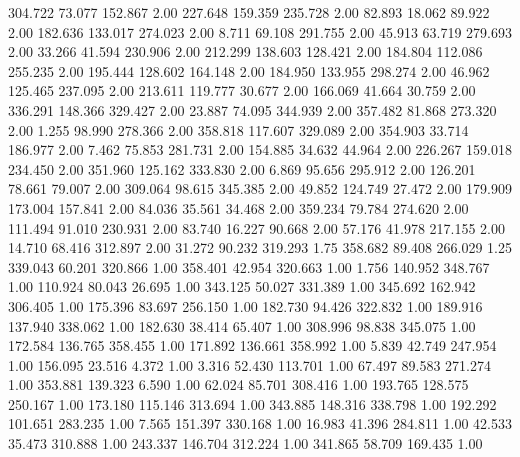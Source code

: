  304.722   73.077  152.867         2.00
 227.648  159.359  235.728         2.00
  82.893   18.062   89.922         2.00
 182.636  133.017  274.023         2.00
   8.711   69.108  291.755         2.00
  45.913   63.719  279.693         2.00
  33.266   41.594  230.906         2.00
 212.299  138.603  128.421         2.00
 184.804  112.086  255.235         2.00
 195.444  128.602  164.148         2.00
 184.950  133.955  298.274         2.00
  46.962  125.465  237.095         2.00
 213.611  119.777   30.677         2.00
 166.069   41.664   30.759         2.00
 336.291  148.366  329.427         2.00
  23.887   74.095  344.939         2.00
 357.482   81.868  273.320         2.00
   1.255   98.990  278.366         2.00
 358.818  117.607  329.089         2.00
 354.903   33.714  186.977         2.00
   7.462   75.853  281.731         2.00
 154.885   34.632   44.964         2.00
 226.267  159.018  234.450         2.00
 351.960  125.162  333.830         2.00
   6.869   95.656  295.912         2.00
 126.201   78.661   79.007         2.00
 309.064   98.615  345.385         2.00
  49.852  124.749   27.472         2.00
 179.909  173.004  157.841         2.00
  84.036   35.561   34.468         2.00
 359.234   79.784  274.620         2.00
 111.494   91.010  230.931         2.00
  83.740   16.227   90.668         2.00
  57.176   41.978  217.155         2.00
  14.710   68.416  312.897         2.00
  31.272   90.232  319.293         1.75
 358.682   89.408  266.029         1.25
 339.043   60.201  320.866         1.00
 358.401   42.954  320.663         1.00
   1.756  140.952  348.767         1.00
 110.924   80.043   26.695         1.00
 343.125   50.027  331.389         1.00
 345.692  162.942  306.405         1.00
 175.396   83.697  256.150         1.00
 182.730   94.426  322.832         1.00
 189.916  137.940  338.062         1.00
 182.630   38.414   65.407         1.00
 308.996   98.838  345.075         1.00
 172.584  136.765  358.455         1.00
 171.892  136.661  358.992         1.00
   5.839   42.749  247.954         1.00
 156.095   23.516    4.372         1.00
   3.316   52.430  113.701         1.00
  67.497   89.583  271.274         1.00
 353.881  139.323    6.590         1.00
  62.024   85.701  308.416         1.00
 193.765  128.575  250.167         1.00
 173.180  115.146  313.694         1.00
 343.885  148.316  338.798         1.00
 192.292  101.651  283.235         1.00
   7.565  151.397  330.168         1.00
  16.983   41.396  284.811         1.00
  42.533   35.473  310.888         1.00
 243.337  146.704  312.224         1.00
 341.865   58.709  169.435         1.00

